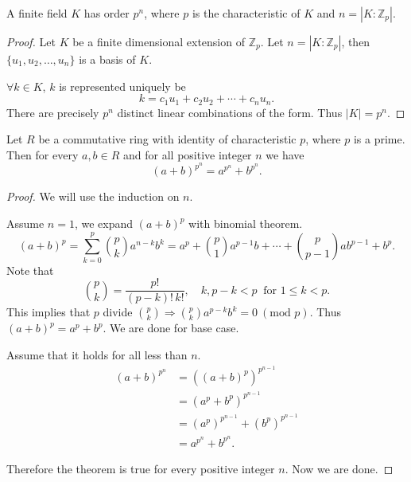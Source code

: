 \begin{theorem}
    A finite field $K$ has order $p^n$, where $p$ is the characteristic of $K$ 
    and $n = |K:\mathbb{Z}_p|$.
\end{theorem}
\begin{proof}
    Let $K$ be a finite dimensional extension of $\mathbb{Z}_p$. Let $n = |K:\mathbb{Z}_p|$, then 
    $\{ u_1, u_2, \ldots, u_n \}$ is a basis of $K$.

    $\forall k \in K$, $k$ is represented uniquely be 
    \[
        k = c_1 u_1 + c_2 u_2 + \cdots + c_nu_n.
    \]
    There are precisely $p^n$ distinct linear combinations of the form. Thus 
    $|K| = p^n$.
\end{proof}

\begin{lemma}
    Let $R$ be a commutative ring with identity of characteristic $p$, where $p$ is a prime.
    Then for every $a, b \in R$ and for all positive integer $n$ we have 
    \begin{equation}
        (a + b)^{p^n} = a^{p^n} + b^{p^n}.
    \end{equation}
\end{lemma}
\begin{proof}
    We will use the induction on $n$. 
    
    Assume $n = 1$, we expand $(a+b)^p$ with binomial theorem.
    \[
        (a+b)^p = \sum^p_{k=0} {p \choose k} a^{n-k}b^k = a^p + 
        {p \choose 1} a^{p-1}b + \cdots + {p \choose p-1} ab^{p-1} + b^p.
    \]
    Note that 
    \[
        {p \choose k} = \frac{p!}{(p-k)!\, k!}, \quad k, p-k < p \> \text{ for } 1 \leq k < p.
    \]
    This implies that $p$ divide ${p \choose k} \Longrightarrow 
    {p \choose k}a^{p-k}b^k = 0 \> (\text{mod } p)$. Thus $(a+b)^p = a^p + b^p$. 
    We are done for base case.

    Assume that it holds for all less than $n$.
    \begin{align*}
        (a+b)^{p^n} &= \left( (a+b)^p \right)^{p^{n-1}} \\
        &= (a^p + b^p)^{p^{n-1}}\\
        &= (a^p)^{p^{n-1}} + (b^p)^{p^{n-1}}\\
        &= a^{p^n} + b^{p^n}.
    \end{align*}

    Therefore the theorem is true for every positive integer $n$. Now we are done.
\end{proof}

